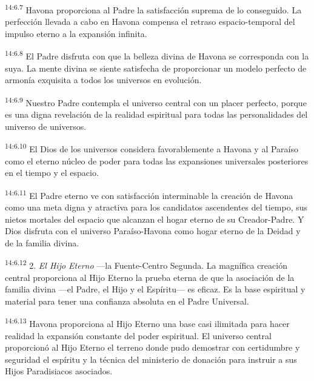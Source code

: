 \par
\textsuperscript{14:6.7} Havona proporciona al Padre la satisfacción suprema de lo conseguido. La perfección llevada a cabo en Havona compensa el retraso espacio-temporal del impulso eterno a la expansión infinita.

\par
\textsuperscript{14:6.8} El Padre disfruta con que la belleza divina de Havona se corresponda con la suya. La mente divina se siente satisfecha de proporcionar un modelo perfecto de armonía exquisita a todos los universos en evolución.

\par
\textsuperscript{14:6.9} Nuestro Padre contempla el universo central con un placer perfecto, porque es una digna revelación de la realidad espiritual para todas las personalidades del universo de universos.

\par
\textsuperscript{14:6.10} El Dios de los universos considera favorablemente a Havona y al Paraíso como el eterno núcleo de poder para todas las expansiones universales posteriores en el tiempo y el espacio.

\par
\textsuperscript{14:6.11} El Padre eterno ve con satisfacción interminable la creación de Havona como una meta digna y atractiva para los candidatos ascendentes del tiempo, sus nietos mortales del espacio que alcanzan el hogar eterno de su Creador-Padre. Y Dios disfruta con el universo Paraíso-Havona como hogar eterno de la Deidad y de la familia divina.

\par
\textsuperscript{14:6.12} 2. \textit{El Hijo Eterno} ---la Fuente-Centro Segunda. La magnífica creación central proporciona al Hijo Eterno la prueba eterna de que la asociación de la familia divina ---el Padre, el Hijo y el Espíritu--- es eficaz. Es la base espiritual y material para tener una confianza absoluta en el Padre Universal.

\par
\textsuperscript{14:6.13} Havona proporciona al Hijo Eterno una base casi ilimitada para hacer realidad la expansión constante del poder espiritual. El universo central proporcionó al Hijo Eterno el terreno donde pudo demostrar con certidumbre y seguridad el espíritu y la técnica del ministerio de donación para instruir a sus Hijos Paradisiacos asociados.

